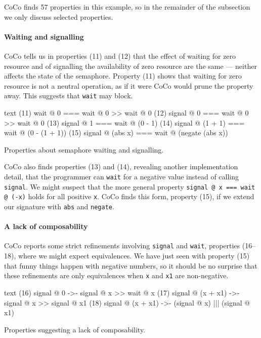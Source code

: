 CoCo finds 57 properties in this example, so in the remainder of the
subsection we only discuss selected properties.

\paragraph{Waiting and signalling}
CoCo tells us in properties (11) and (12) that the effect of waiting
for zero resource and of signalling the availability of zero resource
are the same --- neither affects the state of the semaphore.  Property
(11) shows that waiting for zero resource is not a neutral operation,
as if it were CoCo would prune the property away.  This suggests that
\verb|wait| may block.

\begin{listing}
\centering
\begin{cminted}{text}
(11)          wait @ 0  ===  wait @ 0 >> wait @ 0
(12)        signal @ 0  ===  wait @ 0 >> wait @ 0
(13)        signal @ 1  ===  wait @ (0 - 1)
(14)  signal @ (1 + 1)  ===  wait @ (0 - (1 + 1))
(15)  signal @ (abs x)  ===  wait @ (negate (abs x))
\end{cminted}
\caption{Properties about semaphore waiting and signalling.}\label{lst:sem2}
\end{listing}

CoCo also finds properties (13) and (14), revealing another
implementation detail, that the programmer can \verb|wait| for a
negative value instead of calling \verb|signal|.  We might suspect
that the more general property \verb|signal @ x === wait @ (-x)| holds
for all positive \verb|x|.  CoCo finds this form, property (15), if we
extend our signature with \verb|abs| and \verb|negate|.

\paragraph{A lack of composability}
CoCo reports some strict refinements involving \verb|signal| and
\verb|wait|, properties (16--18), where we might expect equivalences.
We have just seen with property (15) that funny things happen with
negative numbers, so it should be no surprise that these refinements
are only equivalences when \verb|x| and \verb|x1| are non-negative.

\begin{listing}
\centering
\begin{cminted}{text}
(16)         signal @ 0  ->-  signal @ x >> wait @ x
(17)  signal @ (x + x1)  ->-  signal @ x >> signal @ x1
(18)  signal @ (x + x1)  ->-  (signal @ x) ||| (signal @ x1)
\end{cminted}
\caption{Properties suggesting a lack of composability.}\label{lst:sem3}
\end{listing}

